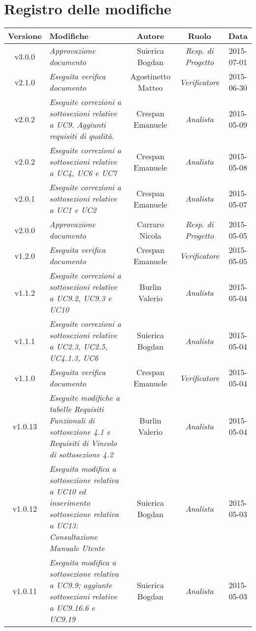 \newpage
\section*{Registro delle modifiche}

\begin{table}[h]
\centering
\begin{tabular}{|c|p{}|c|c|c|}
	\toprule
		\textbf{Versione} & \textbf{Modifiche} & \textbf{Autore} & \textbf{Ruolo} & \textbf{Data}\\
	\midrule
	\midrule

		v3.0.0 & \textit{Approvazione documento} & Suierica Bogdan & \textit{Resp. di Progetto} & 2015-07-01 \\
	\midrule
		v2.1.0 & \textit{Eseguita verifica documento} & Agostinetto Matteo & \textit{Verificatore} & 2015-06-30 \\
	\midrule
		v2.0.2 & \textit{Eseguite correzioni a sottosezioni relative a UC9. Aggiunti requisiti di qualità.} & Crespan Emanuele & \textit{Analista} & 2015-05-09 \\
	\midrule
		v2.0.2 & \textit{Eseguite correzioni a sottosezioni relative a UC4, UC6 e UC7} & Crespan Emanuele & \textit{Analista} & 2015-05-08 \\
	\midrule
		v2.0.1 & \textit{Eseguite correzioni a sottosezioni relative a UC1 e UC2} & Crespan Emanuele & \textit{Analista} & 2015-05-07 \\
	\midrule
		v2.0.0 & \textit{Approvazione documento} & Carraro Nicola & \textit{Resp. di Progetto} & 2015-05-05 \\
	\midrule
		v1.2.0 & \textit{Eseguita verifica documento} & Crespan Emanuele & \textit{Verificatore} & 2015-05-05 \\
	\midrule
		v1.1.2 & \textit{Eseguite correzioni a sottosezioni relative a UC9.2, UC9.3 e UC10} & Burlin Valerio & \textit{Analista} & 2015-05-04\\
	\midrule
		v1.1.1 & \textit{Eseguite correzioni a sottosezioni relative a UC2.3, UC2.5, UC4.1.3, UC6} & Suierica Bogdan & \textit{Analista} & 2015-05-04\\
	\midrule
		v1.1.0 & \textit{Eseguita verifica documento} & Crespan Emanuele & \textit{Verificatore} & 2015-05-04\\
	\midrule
		v1.0.13 & \textit{Eseguite modifiche a tabelle Requisiti Funzionali di sottosezione 4.1 e Requisiti di Vincolo di sottosezione 4.2} & Burlin Valerio & \textit{Analista} & 2015-05-04\\
	\midrule
		v1.0.12 & \textit{Eseguita modifica a sottosezione relativa a UC10 ed inserimento sottosezione relativa a UC13: Consultazione Manuale Utente} & Suierica Bogdan & \textit{Analista} & 2015-05-03\\
	\midrule
		v1.0.11 & \textit{Eseguita modifica a sottosezione relativa a UC9.9; aggiunte sottosezioni relative a UC9.16.6 e UC9.19} & Suierica Bogdan & \textit{Analista} & 2015-05-03\\

	\bottomrule
\end{tabular}
\end{table}
